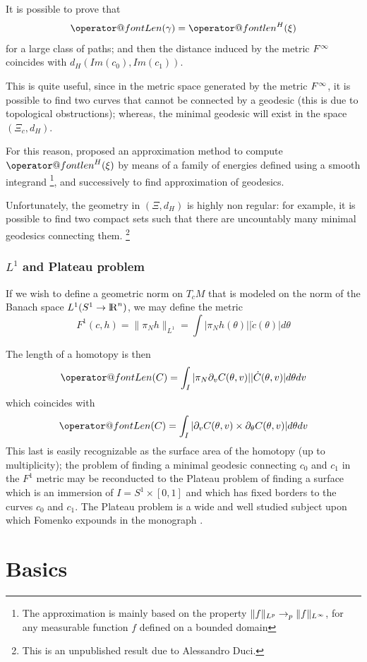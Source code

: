 \documentclass[twoside,a4paper,english]{article}
\makeatletter
\def\derpar#1{\partial_{#1}}
\def\len{\mathop{\operator@font len}\nolimits}
\def\Len{\mathop{\operator@font Len}\nolimits}
\makeatother
\begin{document}
It is possible to prove that 
\[ \Len (\gamma) = \len^H(\xi) \] 
for a large class of paths; and then
the distance induced by the metric $F^\infty$ coincides with
$d_H(Im(c_0),Im(c_1))$.

This is quite useful, since in
the metric space generated by the metric $F^\infty$, it is possible
to find two curves that cannot be connected by a geodesic
(this is due to topological obstructions); whereas, the minimal geodesic will
exist in the space $(\Xi_c,d_H)$.

For this reason, \cite{Faugeras:App} proposed an approximation method
to compute $\len^H(\xi)$ by means of a family of energies
defined using a smooth integrand%
\footnote{The approximation is mainly
  based on the property $\|f\|_{L^p} \to_p \|f\|_{L^\infty}$,
  for any measurable function $f$ defined on a bounded domain
}, and successively to find approximation of geodesics.

Unfortunately, the geometry in $(\Xi,d_H)$ is highly non regular:
for example, it is possible to find two compact sets such that
there are uncountably many minimal geodesics connecting them.%
\footnote{This is an unpublished result due to Alessandro Duci.}

\subsubsection{$L^1$ and  Plateau problem}
If we wish to define a geometric norm on
$T_cM$ that is modeled on the norm of
the Banach space $L^1(S^1\to{\protect\mathrm{l\hskip-0.15em R}}^n)$,  we may define
the metric
\[ F^1(c,h)= \|\pi_N h\|_{L^1}=\int |\pi_N h(\theta)|
   |\dot c(\theta)|d\theta \] 

The length of a homotopy is then
\[ \Len (C) =\int_I  |\pi_N \derpar v C(\theta,v)| |\dot C(\theta,v)| 
d\theta dv\]
which coincides with
\[ \Len (C) =\int_I  | \derpar v C(\theta,v) \times 
\derpar\theta C(\theta,v)| 
d\theta dv\]
This last is easily recognizable as the surface area of the homotopy
(up to multiplicity); the problem of finding a minimal geodesic
connecting $c_0$ and $c_1$ 
in the $F^1$ metric may be reconducted to 
the Plateau problem of finding a surface 
which is an immersion of $I=S^1\times [0,1]$ and which has
fixed borders to the curves $c_0$ and $c_1$.
The Plateau problem is a wide and well studied subject
upon which Fomenko expounds in the monograph \cite{fomenko:plateau}.

 


\section{Basics}
\end{document}

